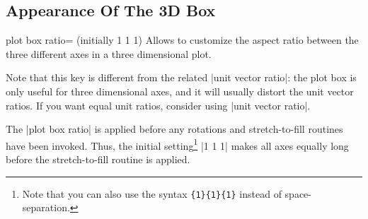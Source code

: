 {\subsection{Appearance Of The 3D Box}

\begin{pgfplotskey}{plot box ratio= (initially 1 1 1)}
    Allows to customize the aspect ratio between the three different axes in a
    three dimensional plot.

    Note that this key is different from the related |unit vector ratio|: the
    plot box is only useful for three dimensional axes, and it will usually
    distort the unit vector ratios. If you want equal unit ratios, consider
    using |unit vector ratio|.

    The |plot box ratio| is applied before any rotations and stretch-to-fill
    routines have been invoked. Thus, the initial setting\footnote{Note that
    you can also use the syntax \texttt{\{1\}\{1\}\{1\}} instead of
    space-separation.} |1 1 1| makes all axes equally long before the
    stretch-to-fill routine is applied.
\pgfplotsexpensiveexample
\begin{codeexample}[]
\end{codeexample}

\pgfplotsexpensiveexample
\begin{codeexample}[]
\end{codeexample}


\end{pgfplotskey}}

